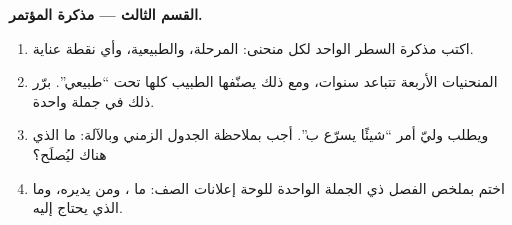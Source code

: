\begin{problem}
\medskip\noindent\textbf{القسم الثالث --- مذكرة
المؤتمر.}
\begin{enumerate}[resume]
  \item اكتب مذكرة السطر الواحد لكل منحنى: المرحلة، والطبيعية،
        وأي نقطة عناية.
  \item المنحنيات الأربعة تتباعد سنوات، ومع ذلك يصنّفها الطبيب
        كلها تحت ``طبيعي''. برّر ذلك في جملة واحدة.
  \item ويطلب وليّ أمر ``شيئًا يسرّع ب''. أجب بملاحظة الجدول
        الزمني وبالآلة: ما الذي هناك ليُصلَح؟
  \item اختم بملخص الفصل ذي الجملة الواحدة للوحة إعلانات الصف:
        ما ، ومن يديره، وما الذي يحتاج إليه.
\end{enumerate}
\end{problem}
